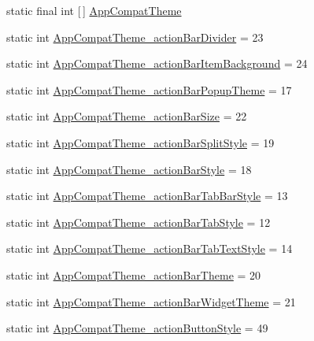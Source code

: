 \begin{DoxyCompactItemize}
\item 
static final int \mbox{[}$\,$\mbox{]} \hyperlink{classandroid_1_1support_1_1design_1_1R_1_1styleable_afb351dc8de20cbd4c89abe360373010c}{App\+Compat\+Theme}
\item 
static int \hyperlink{classandroid_1_1support_1_1design_1_1R_1_1styleable_a114c1b92963957310f5ba215a1c81a77}{App\+Compat\+Theme\+\_\+action\+Bar\+Divider} = 23
\item 
static int \hyperlink{classandroid_1_1support_1_1design_1_1R_1_1styleable_af6c020b0e1ecf70811c2d81f3d06d55b}{App\+Compat\+Theme\+\_\+action\+Bar\+Item\+Background} = 24
\item 
static int \hyperlink{classandroid_1_1support_1_1design_1_1R_1_1styleable_abe6573d781c288c0c9046d1b364bc010}{App\+Compat\+Theme\+\_\+action\+Bar\+Popup\+Theme} = 17
\item 
static int \hyperlink{classandroid_1_1support_1_1design_1_1R_1_1styleable_aa3e26576191105ff3f5ba8a1d92c188f}{App\+Compat\+Theme\+\_\+action\+Bar\+Size} = 22
\item 
static int \hyperlink{classandroid_1_1support_1_1design_1_1R_1_1styleable_a1bb68b5f66ea4a588bc4527379e17f79}{App\+Compat\+Theme\+\_\+action\+Bar\+Split\+Style} = 19
\item 
static int \hyperlink{classandroid_1_1support_1_1design_1_1R_1_1styleable_a762be5b610718b70a3cf442d4599d870}{App\+Compat\+Theme\+\_\+action\+Bar\+Style} = 18
\item 
static int \hyperlink{classandroid_1_1support_1_1design_1_1R_1_1styleable_ab0c563d507ebb2630a4566f31cf6f123}{App\+Compat\+Theme\+\_\+action\+Bar\+Tab\+Bar\+Style} = 13
\item 
static int \hyperlink{classandroid_1_1support_1_1design_1_1R_1_1styleable_a1347569d26ea3874ad7e4895dd851764}{App\+Compat\+Theme\+\_\+action\+Bar\+Tab\+Style} = 12
\item 
static int \hyperlink{classandroid_1_1support_1_1design_1_1R_1_1styleable_afd214b041105e6d734d0bcb07952db44}{App\+Compat\+Theme\+\_\+action\+Bar\+Tab\+Text\+Style} = 14
\item 
static int \hyperlink{classandroid_1_1support_1_1design_1_1R_1_1styleable_a546d385fc73621e6d2b4a7651393cf97}{App\+Compat\+Theme\+\_\+action\+Bar\+Theme} = 20
\item 
static int \hyperlink{classandroid_1_1support_1_1design_1_1R_1_1styleable_aa29dc2ceab71fce65a98112d59814cc4}{App\+Compat\+Theme\+\_\+action\+Bar\+Widget\+Theme} = 21
\item 
static int \hyperlink{classandroid_1_1support_1_1design_1_1R_1_1styleable_a7624e37d8aabda6278719ae78bd6ceac}{App\+Compat\+Theme\+\_\+action\+Button\+Style} = 49

\end{DoxyCompactItemize}

